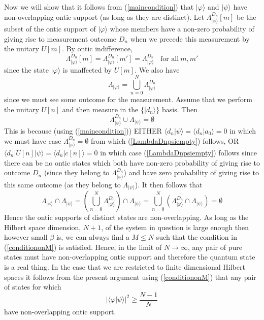 \documentclass[12pt]{article}
\begin{document}
Now we will show that it follows from (\ref{maincondition}) that $|\varphi\rangle$ and $|\psi\rangle$ have non-overlapping ontic support (as long as they are distinct).  Let
$\Lambda_{|\varphi\rangle}^{D_n}[m]$ be the subset of the ontic support of $|\varphi\rangle$ whose members have a non-zero probability of giving rise to measurement outcome $D_n$ when we
precede this measurement by the unitary $U[m]$.  By ontic indifference, \begin{equation} \Lambda_{|\varphi\rangle}^{D_n}[m] = \Lambda_{|\varphi\rangle}^{D_n}[m'] =
\Lambda_{|\varphi\rangle}^{D_n}  ~~~~ \text{for all}~m, m' \end{equation} since the state $|\varphi\rangle$ is unaffected by $U[m]$. We also have \begin{equation} \Lambda_{|\varphi\rangle} =
\bigcup_{n=0}^N \Lambda_{|\varphi\rangle}^{D_n} \end{equation} since we must see some outcome for the measurement. Assume that we perform the unitary $U[n]$ and then measure in the
$\{|d_n\rangle\}$ basis. Then \begin{equation}\label{LambdaDnpsiempty}
 \Lambda_{|\varphi\rangle}^{D_n} \cup \Lambda_{|\psi\rangle} = \emptyset
\end{equation} This is because (using (\ref{maincondition})) EITHER $\langle d_n|\psi\rangle=\langle d_n|a_0\rangle=0$ in which we must have case $\Lambda_{|\varphi\rangle}^{D_n}=\emptyset$
from which (\ref{LambdaDnpsiempty}) follows, OR  $\langle d_n| U[n]| \psi\rangle = \langle d_n |c[n] \rangle = 0$ in which case (\ref{LambdaDnpsiempty}) follows since there can be no ontic
states which both have non-zero probability of giving rise to outcome $D_n$ (since they belong to $\Lambda_{|\varphi\rangle}^{D_n}$) and have zero probability of giving rise to this same
outcome (as they belong to $\Lambda_{|\psi\rangle}$).  It then follows that \begin{equation}
 \Lambda_{|\varphi\rangle} \cap \Lambda_{|\psi\rangle} = \left( \bigcup_{n=0}^N \Lambda_{|\varphi\rangle}^{D_n} \right) \cap  \Lambda_{|\psi\rangle}
 =  \bigcup_{n=0}^N \left( \Lambda_{|\varphi\rangle}^{D_n} \cap  \Lambda_{|\psi\rangle} \right) = \emptyset
\end{equation} Hence the ontic supports of distinct states are non-overlapping.  As long as the Hilbert space dimension, $N+1$, of the system in question is large enough then however small
$\beta$ is, we can always find a $M\leq N$ such that the condition in (\ref{conditiononM}) is satisfied.  Hence, in the limit of $N\rightarrow \infty$, any pair of pure states must have
non-overlapping ontic support and therefore the quantum state is a real thing.  In the case that we are restricted to finite dimensional Hilbert spaces it follows from the present argument
using (\ref{conditiononM}) that any pair of states for which \begin{equation} |\langle \varphi| \psi\rangle|^2 \geq \frac{N-1}{N} \end{equation} have non-overlapping ontic support.
\end{document}
